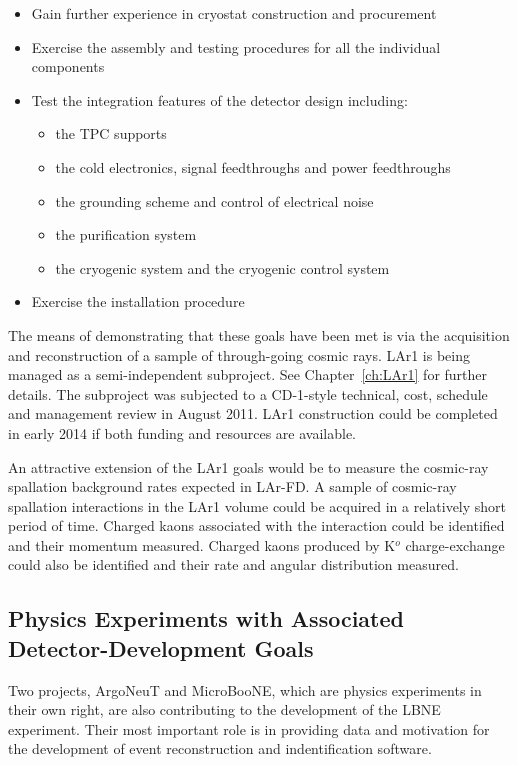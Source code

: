 \begin{itemize}
\item Gain further experience in cryostat construction and procurement
\item Exercise the assembly and testing procedures for all the individual components
\item Test the integration features of the detector design including:
\begin{itemize}
\item the TPC supports
\item the cold electronics, signal feedthroughs and power feedthroughs
\item the grounding scheme and control of electrical noise
\item the purification system
\item the cryogenic system and the cryogenic control system
\end{itemize}
\item  Exercise the installation procedure
\end{itemize}

The means of demonstrating that these goals have been met is via the acquisition and reconstruction of a sample of through-going cosmic rays. LAr1 is being managed as a semi-independent subproject. See Chapter~\ref{ch:LAr1} for further details. The subproject was subjected to a CD-1-style technical, cost, schedule and management review in August 2011.  LAr1 construction could be completed in early 2014 if both funding and resources are available.

An attractive extension of the LAr1 goals would be to measure the cosmic-ray spallation background rates expected in LAr-FD. A sample of cosmic-ray spallation interactions in the LAr1 volume could be acquired in a relatively short period of time. Charged kaons associated with the interaction could be identified and their momentum measured. Charged kaons produced by K$^o$ charge-exchange could also be identified and their rate and angular distribution measured. 

\subsection{Physics Experiments with Associated Detector-Development Goals}
Two projects, ArgoNeuT and MicroBooNE,  which are physics experiments in their own right, are also contributing to the development of the LBNE experiment. Their most important role is in providing data and motivation for the development of event reconstruction and indentification software.

